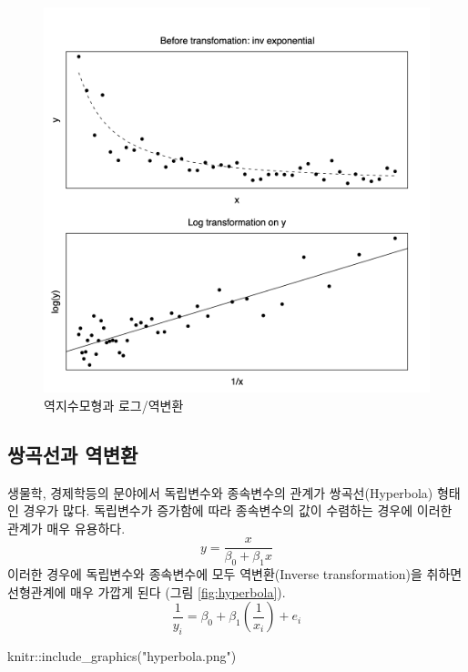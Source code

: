 \documentclass[
]{book}
\newenvironment{Shaded}{\begin{snugshade}}{\end{snugshade}}
\newcommand{\FunctionTok}[1]{\textcolor[rgb]{0.00,0.00,0.00}{#1}}
\newcommand{\NormalTok}[1]{#1}
\newcommand{\SpecialCharTok}[1]{\textcolor[rgb]{0.00,0.00,0.00}{#1}}
\newcommand{\StringTok}[1]{\textcolor[rgb]{0.31,0.60,0.02}{#1}}
\theoremstyle{definition}
\theoremstyle{definition}
\theoremstyle{definition}
\theoremstyle{definition}
\theoremstyle{remark}
\begin{document}
\begin{figure}
\includegraphics[width=0.8\linewidth]{invexp} \caption{역지수모형과 로그/역변환}\label{fig:invexpz}
\end{figure}

\hypertarget{uxc30duxace1uxc120uxacfc-uxc5eduxbcc0uxd658}{%
\subsection{쌍곡선과 역변환}\label{uxc30duxace1uxc120uxacfc-uxc5eduxbcc0uxd658}}

생물학, 경제학등의 문야에서 독립변수와 종속변수의 관계가 쌍곡선(Hyperbola) 형태인 경우가 많다. 독립변수가 증가함에 따라 종속변수의 값이 수렴하는 경우에 이러한 관계가 매우 유용하다.
\[ y = \frac{x}{\beta_0 + \beta_1 x} \]
이러한 경우에 독립변수와 종속변수에 모두 역변환(Inverse transformation)을 취하면 선형관계에 매우 가깝게 된다 (그림 \ref{fig:hyperbola}).
\[ \frac{1}{y_i} = \beta_0 + \beta_1 \left ( \frac{1}{x_i} \right ) + e_i \]

\begin{Shaded}
\begin{Highlighting}[]
\NormalTok{knitr}\SpecialCharTok{::}\FunctionTok{include\_graphics}\NormalTok{(}\StringTok{"hyperbola.png"}\NormalTok{)}
\end{Highlighting}
\end{Shaded}
\end{document}
